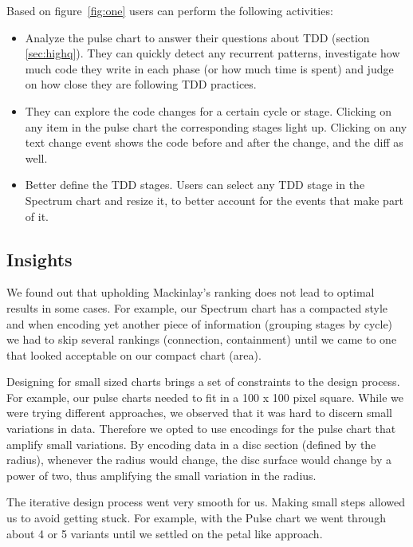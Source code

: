 \documentclass[journal]{vgtc}                %
\begin{document}
Based on figure~\ref{fig:one} users can perform the following activities:
\begin{itemize}
	\item Analyze the pulse chart to answer their questions about TDD (section \ref{sec:highq}). 
	They can quickly detect any recurrent patterns, investigate how much code  they write in each phase (or how much time is spent) and judge on how close they are following TDD practices.
	
	\item They can explore the code changes for a certain cycle or stage. 
	Clicking on any item in the pulse chart the corresponding stages light up.
	Clicking on any text change event shows the code before and after the change, and the diff as well.
	
	\item Better define the TDD stages.
	Users can select any TDD stage in the Spectrum chart and resize it, to better account for the events that make part of it.
\end{itemize}

\subsection{Insights}

We found out that upholding Mackinlay's ranking does not lead to optimal results in some cases.
For example, our Spectrum chart has a compacted style and when encoding yet another piece of information (grouping stages by cycle) we had to skip several rankings (connection, containment) until we came to one that looked acceptable on our compact chart (area).

Designing for small sized charts brings a set of constraints to the design process.
For example, our pulse charts needed to fit in a 100 x 100 pixel square.
While we were trying different approaches, we observed that it was hard to discern small variations in data.
Therefore we opted to use encodings for the pulse chart that amplify small variations.
By encoding data in a disc section (defined by the radius), whenever the radius would change, the disc surface would change by a power of two, thus amplifying the small variation in the radius.

The iterative design process went very smooth for us.
Making small steps allowed us to avoid getting stuck.
For example, with the Pulse chart we went through about 4 or 5 variants until we settled on the petal like approach.
\end{document}
